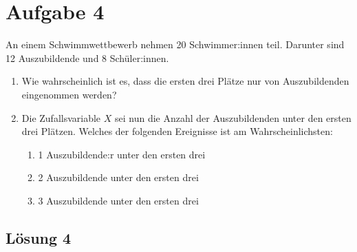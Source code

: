 \documentclass[main.tex]{subfiles}
\begin{document}
\section{Aufgabe 4}
An einem Schwimmwettbewerb nehmen 20 Schwimmer:innen teil. Darunter sind 12
Auszubildende und 8 Schüler:innen.
\begin{enumerate}
    \item Wie wahrscheinlich ist es, dass die ersten drei Plätze nur von Auszubildenden eingenommen werden?
    \item Die Zufallsvariable $X$ sei nun die \glqq Anzahl der Auszubildenden unter den ersten drei Plätzen\grqq. Welches der folgenden Ereignisse ist am Wahrscheinlichsten:
    \begin{enumerate}
        \item  1 Auszubildende:r unter den ersten drei
        \item 2 Auszubildende unter den ersten drei
        \item 3 Auszubildende unter den ersten drei
    \end{enumerate}
\end{enumerate}

\subsection{Lösung 4}
\end{document}
